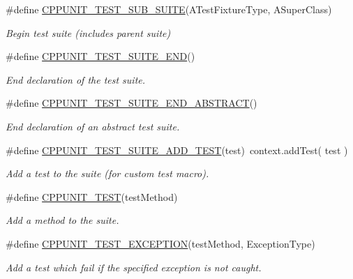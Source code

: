 \begin{DoxyCompactItemize}
\#define \hyperlink{group___writing_test_fixture_gae19f30ade82172cf6c3ff297367a10c2}{C\+P\+P\+U\+N\+I\+T\+\_\+\+T\+E\+S\+T\+\_\+\+S\+U\+B\+\_\+\+S\+U\+I\+T\+E}(A\+Test\+Fixture\+Type, A\+Super\+Class)
\begin{DoxyCompactList}\small\item\em Begin test suite (includes parent suite) \end{DoxyCompactList}\item 
\#define \hyperlink{group___writing_test_fixture_ga601b2e1d525f3947b216e28c625abcb1}{C\+P\+P\+U\+N\+I\+T\+\_\+\+T\+E\+S\+T\+\_\+\+S\+U\+I\+T\+E\+\_\+\+E\+N\+D}()
\begin{DoxyCompactList}\small\item\em End declaration of the test suite. \end{DoxyCompactList}\item 
\#define \hyperlink{group___writing_test_fixture_gadcb50ede05c9da831bd8b0140fb59094}{C\+P\+P\+U\+N\+I\+T\+\_\+\+T\+E\+S\+T\+\_\+\+S\+U\+I\+T\+E\+\_\+\+E\+N\+D\+\_\+\+A\+B\+S\+T\+R\+A\+C\+T}()
\begin{DoxyCompactList}\small\item\em End declaration of an abstract test suite. \end{DoxyCompactList}\item 
\#define \hyperlink{group___writing_test_fixture_gaace55a4a3a4f3e0cd219d38e98d4f48f}{C\+P\+P\+U\+N\+I\+T\+\_\+\+T\+E\+S\+T\+\_\+\+S\+U\+I\+T\+E\+\_\+\+A\+D\+D\+\_\+\+T\+E\+S\+T}(test)~context.\+add\+Test( test )
\begin{DoxyCompactList}\small\item\em Add a test to the suite (for custom test macro). \end{DoxyCompactList}\item 
\#define \hyperlink{group___writing_test_fixture_gaac9b03d898b207e1daf2f93867935a96}{C\+P\+P\+U\+N\+I\+T\+\_\+\+T\+E\+S\+T}(test\+Method)
\begin{DoxyCompactList}\small\item\em Add a method to the suite. \end{DoxyCompactList}\item 
\#define \hyperlink{group___writing_test_fixture_gaca8eeb6f60714baade6cbfd185868c40}{C\+P\+P\+U\+N\+I\+T\+\_\+\+T\+E\+S\+T\+\_\+\+E\+X\+C\+E\+P\+T\+I\+O\+N}(test\+Method, Exception\+Type)
\begin{DoxyCompactList}\small\item\em Add a test which fail if the specified exception is not caught. \end{DoxyCompactList}\item 

\end{DoxyCompactItemize}
